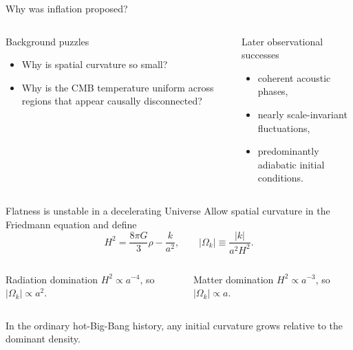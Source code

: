 \begin{frame}{Why was inflation proposed?}
\begin{columns}[T]
\begin{block}{Background puzzles}
\begin{itemize}
\item Why is spatial curvature so small?
\item Why is the CMB temperature uniform across regions that appear causally disconnected?
\end{itemize}
\end{block}
\begin{block}{Later observational successes}
\begin{itemize}
\item coherent acoustic phases,
\item nearly scale-invariant fluctuations,
\item predominantly adiabatic initial conditions.
\end{itemize}
\end{block}
\end{columns}
\end{frame}

\begin{frame}{Flatness is unstable in a decelerating Universe}
Allow spatial curvature in the Friedmann equation and define
\[
H^2=\frac{8\pi G}{3}\rho-\frac{k}{a^2},
\qquad |\Omega_k|\equiv\frac{|k|}{a^2H^2}.
\]
\begin{columns}[T]
\begin{block}{Radiation domination}
$H^2\propto a^{-4}$, so $|\Omega_k|\propto a^2$.
\end{block}
\begin{block}{Matter domination}
$H^2\propto a^{-3}$, so $|\Omega_k|\propto a$.
\end{block}
\end{columns}
In the ordinary hot-Big-Bang history, any initial curvature grows relative to the dominant density.
\end{frame}

